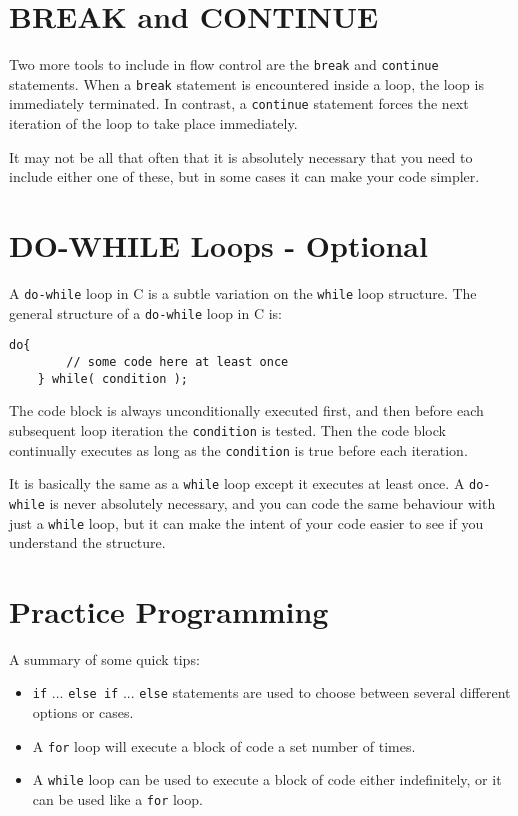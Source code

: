 \documentclass{pass}
\begin{document}
\section*{BREAK and CONTINUE}
Two more tools to include in flow control are the \texttt{break} and \texttt{continue} statements. When a \texttt{break} statement is encountered inside a loop, the loop is immediately terminated. In contrast, a \texttt{continue} statement  forces the next iteration of the loop to take place immediately.

It may not be all that often that it is absolutely necessary that you need to include either one of these, but in some cases it can make your code simpler.

\section*{DO-WHILE Loops - Optional}
A \texttt{do-while} loop in C is a subtle variation on the \texttt{while} loop structure. The general structure of a \texttt{do-while} loop in C is:
\begin{lstlisting}[style=CStyle]
	do{
		// some code here at least once
	} while( condition );
\end{lstlisting}
The code block is always unconditionally executed first, and then before each subsequent loop iteration the \texttt{condition} is tested. Then the code block continually executes as long as the \texttt{condition} is true before each iteration.

It is basically the same as a \texttt{while} loop except it executes at least once. A \texttt{do-while} is never absolutely necessary, and you can code the same behaviour with just a \texttt{while} loop, but it can make the intent of your code easier to see if you understand the structure.

\pagebreak

\section*{Practice Programming}
A summary of some quick tips:
\begin{itemize}
\item \texttt{if} ... \texttt{else if} ... \texttt{else} statements are used to choose between several different options or cases.
\item A \texttt{for} loop will execute a block of code a set number of times.
\item A \texttt{while} loop can be used to execute a block of code either indefinitely, or it can be used like a \texttt{for} loop.\\[12pt]
\end{itemize}
\end{document}
